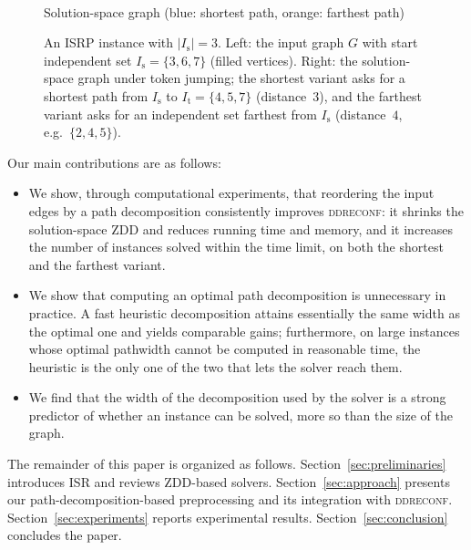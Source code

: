 \documentclass[conference]{IEEEtran}
\newcommand{\ini}{\mathrm{s}}
\newcommand{\tar}{\mathrm{t}}
\begin{document}
\begin{figure}[t]
\begin{minipage}[t]{0.52\textwidth}
\\[-1mm]
{\small Solution-space graph (blue: shortest path, orange: farthest path)}
\end{minipage}
\caption{An ISRP instance with $|I_\ini|=3$.
Left: the input graph $G$ with start independent set
$I_\ini=\{3,6,7\}$ (filled vertices).
Right: the solution-space graph under token jumping; the shortest variant asks
for a shortest path from $I_\ini$ to $I_\tar=\{4,5,7\}$ (distance~$3$), and the
farthest variant asks for an independent set farthest from $I_\ini$ (distance~$4$,
e.g.\ $\{2,4,5\}$).}
\label{fig:core-example}
\end{figure}

Our main contributions are as follows:
\begin{itemize}
\item We show, through computational experiments, that reordering the input edges
by a path decomposition consistently improves \textsc{ddreconf}: it shrinks the
solution-space ZDD and reduces running time and memory, and it increases the
number of instances solved within the time limit, on both the shortest and the
farthest variant.
\item We show that computing an optimal path decomposition is unnecessary in
practice. A fast heuristic decomposition attains essentially the same width as
the optimal one and yields comparable gains; furthermore, on large instances
whose optimal pathwidth cannot be computed in reasonable time, the heuristic is
the only one of the two that lets the solver reach them.
\item We find that the width of the decomposition used by the solver is a strong
predictor of whether an instance can be solved, more so than the size of the
graph.
\end{itemize}

The remainder of this paper is organized as follows.
Section~\ref{sec:preliminaries} introduces ISR and reviews ZDD-based solvers.
Section~\ref{sec:approach} presents our path-decomposition-based preprocessing
and its integration with \textsc{ddreconf}.
Section~\ref{sec:experiments} reports experimental results.
Section~\ref{sec:conclusion} concludes the paper.
\end{document}
